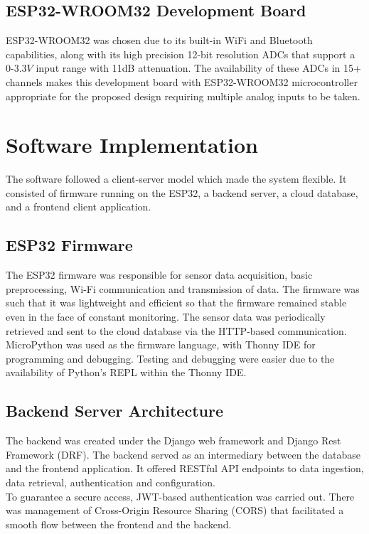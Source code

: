 \subsection{ESP32-WROOM32 Development Board}
ESP32-WROOM32 was chosen due to its built-in WiFi and Bluetooth capabilities, along with its high precision 12-bit resolution ADCs that support a 0-$3.3V$ input range with 11dB attenuation. The availability of these ADCs in 15+ channels makes this development board with ESP32-WROOM32 microcontroller appropriate for the proposed design requiring multiple analog inputs to be taken. 

\section{Software Implementation}
The software followed a client-server model which made the system flexible. It consisted of firmware running on the ESP32, a backend server, a cloud database, and a frontend client application.

\subsection{ESP32 Firmware}
The ESP32 firmware was responsible for sensor data acquisition, basic preprocessing, Wi-Fi communication and transmission of data. The firmware was such that it was lightweight and efficient so that the firmware remained stable even in the face of constant monitoring. The sensor data was periodically retrieved and sent to the cloud database via the HTTP-based communication. MicroPython was used as the firmware language, with Thonny IDE for programming and debugging. Testing and debugging were easier due to the availability of Python’s REPL within the Thonny IDE.

\subsection{Backend Server Architecture}
The backend was created under the Django web framework and Django Rest Framework (DRF). The backend served as an intermediary between the database and the frontend application. It offered RESTful API endpoints to data ingestion, data retrieval, authentication and configuration.\\[8pt]
To guarantee a secure access, JWT-based authentication was carried out. There was management of Cross-Origin Resource Sharing (CORS) that facilitated a smooth flow between the frontend and the backend.

